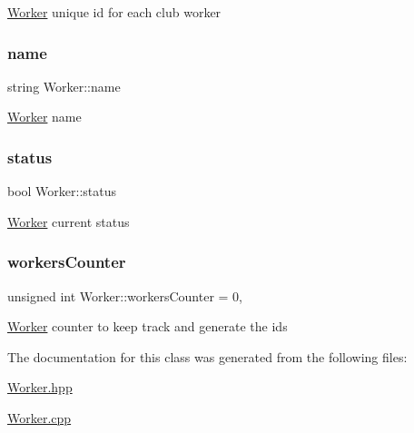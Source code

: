 \hyperlink{class_worker}{Worker} unique id for each club worker \hypertarget{class_worker_a66cf57341253a31e418cf8abad59ffb1}{}\label{class_worker_a66cf57341253a31e418cf8abad59ffb1} 
\subsubsection{\texorpdfstring{name}{name}}
{\footnotesize\ttfamily string Worker\+::name\hspace{0.3cm}{\ttfamily [protected]}}

\hyperlink{class_worker}{Worker} name \hypertarget{class_worker_a86618aa5fcac9253f9a7ca0dc16a31d4}{}\label{class_worker_a86618aa5fcac9253f9a7ca0dc16a31d4} 
\subsubsection{\texorpdfstring{status}{status}}
{\footnotesize\ttfamily bool Worker\+::status\hspace{0.3cm}{\ttfamily [protected]}}

\hyperlink{class_worker}{Worker} current status \hypertarget{class_worker_a5f0df787d74ab0938583c07a09d126bf}{}\label{class_worker_a5f0df787d74ab0938583c07a09d126bf} 
\subsubsection{\texorpdfstring{workers\+Counter}{workersCounter}}
{\footnotesize\ttfamily unsigned int Worker\+::workers\+Counter = 0\hspace{0.3cm}{\ttfamily [static]}, {\ttfamily [protected]}}

\hyperlink{class_worker}{Worker} counter to keep track and generate the ids 

The documentation for this class was generated from the following files\+:\begin{DoxyCompactItemize}
\item 
\hyperlink{_worker_8hpp}{Worker.\+hpp}\item 
\hyperlink{_worker_8cpp}{Worker.\+cpp}\end{DoxyCompactItemize}
